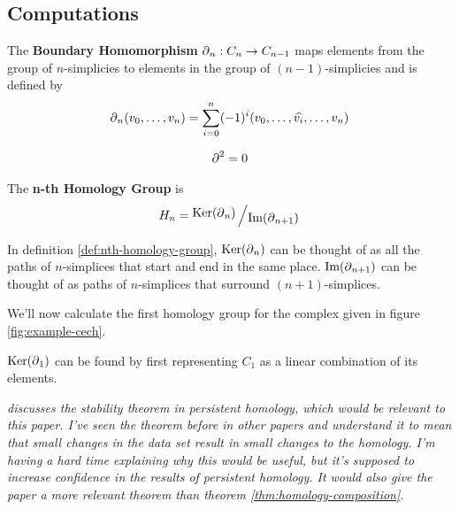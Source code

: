 \subsection{Computations}

\begin{definition}
    The \textbf{Boundary Homomorphism} \(\operatorname{\partial}_n : C_n \to C_{n-1}\) maps elements from the group of \(n\)-simplicies to elements in the group of \((n-1)\)-simplicies and is defined by
    \[
        \operatorname{\partial}_n (v_0,\dots , v_{n}) = \sum_{i=0}^n (-1)^{i}
        (v_0,\dots, \widehat{v_i}, \dots, v_n)
    \]
    \cite{hatcher}
\end{definition}

\begin{theorem}\label{thm:homology-composition}
	\begin{align*}
		\operatorname{\partial} ^2 = 0
	\end{align*}
\end{theorem}

\begin{definition}\label{def:nth-homology-group}
    The \textbf{n-th Homology Group} is \[H_n = \bigslant{\Ker(\boundary_n)}{\Ima(\boundary_{n+1})}\]
    \cite{fraleigha}
\end{definition}

In definition \ref{def:nth-homology-group}, \(\operatorname{Ker}(\operatorname{\partial}_n)\) can be thought of as all the paths of \(n\)-simplices that start and end in the same place.
\(\operatorname{Im}(\operatorname{\partial}_{n+1})\) can be thought of as paths of \(n\)-simplices that surround \((n+1)\)-simplices.

\begin{figure}
    \scalebox{.8}{
        
    }
    \caption{}
    \label{fig:homology-groups}
\end{figure}

\begin{example}
    We'll now calculate the first homology group for the complex given in figure \ref{fig:example-cech}.

    \(\operatorname{Ker}(\operatorname{\partial}_1)\) can be found by first representing \(C_1\) as a linear combination of its elements.

\end{example}

\textit{\cite{cohen-steiner} discusses the stability theorem in persistent homology, which would be relevant to this paper. I've seen the theorem before in other papers and understand it to mean that small changes in the data set result in small changes to the homology. I'm having a hard time explaining why this would be useful, but it's supposed to increase confidence in the results of persistent homology. It would also give the paper a more relevant theorem than theorem \ref{thm:homology-composition}.}

